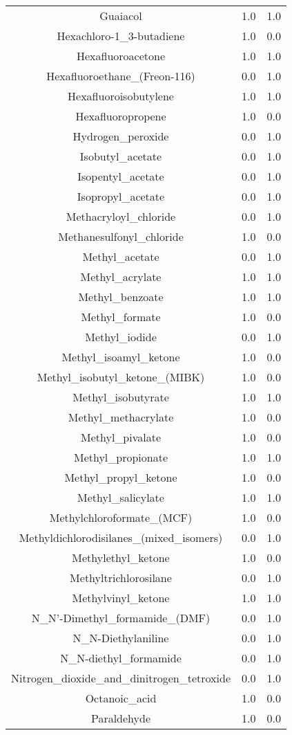 \begin{tabular}{ccc}
Guaiacol &1.0 &1.0\\
Hexachloro-1_3-butadiene &1.0 &0.0\\
Hexafluoroacetone &1.0 &1.0\\
Hexafluoroethane_(Freon-116) &0.0 &1.0\\
Hexafluoroisobutylene &1.0 &1.0\\
Hexafluoropropene &1.0 &0.0\\
Hydrogen_peroxide &0.0 &1.0\\
Isobutyl_acetate &0.0 &1.0\\
Isopentyl_acetate &0.0 &1.0\\
Isopropyl_acetate &0.0 &1.0\\
Methacryloyl_chloride &0.0 &1.0\\
Methanesulfonyl_chloride &1.0 &0.0\\
Methyl_acetate &0.0 &1.0\\
Methyl_acrylate &1.0 &1.0\\
Methyl_benzoate &1.0 &1.0\\
Methyl_formate &1.0 &0.0\\
Methyl_iodide &0.0 &1.0\\
Methyl_isoamyl_ketone &1.0 &0.0\\
Methyl_isobutyl_ketone_(MIBK) &1.0 &0.0\\
Methyl_isobutyrate &1.0 &1.0\\
Methyl_methacrylate &1.0 &0.0\\
Methyl_pivalate &1.0 &0.0\\
Methyl_propionate &1.0 &1.0\\
Methyl_propyl_ketone &1.0 &0.0\\
Methyl_salicylate &1.0 &1.0\\
Methylchloroformate_(MCF) &1.0 &0.0\\
Methyldichlorodisilanes_(mixed_isomers) &0.0 &1.0\\
Methylethyl_ketone &1.0 &0.0\\
Methyltrichlorosilane &0.0 &1.0\\
Methylvinyl_ketone &1.0 &1.0\\
N_N'-Dimethyl_formamide_(DMF) &0.0 &1.0\\
N_N-Diethylaniline &0.0 &1.0\\
N_N-diethyl_formamide &0.0 &1.0\\
Nitrogen_dioxide_and_dinitrogen_tetroxide &0.0 &1.0\\
Octanoic_acid &1.0 &0.0\\
Paraldehyde &1.0 &0.0\\

\end{tabular}
